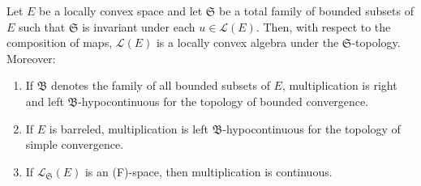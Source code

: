 Let $E$ be a locally convex space and let $\mathfrak{S}$ be a total family of bounded subsets of $E$ such that $\mathfrak{S}$ is invariant under each $u \in \mathcal{L}(E)$. Then, with respect to the composition of maps, $\mathcal{L}(E)$ is a locally convex algebra under the $\mathfrak{S}$-topology. Moreover:

\begin{enumerate}
\item If $\mathfrak{B}$ denotes the family of all bounded subsets of $E$, multiplication is right and left $\mathfrak{B}$-hypocontinuous for the topology of bounded convergence.
\item If $E$ is barreled, multiplication is left $\mathfrak{B}$-hypocontinuous for the topology of simple convergence.
\item If $\mathcal{L}_{\mathfrak{S}}(E)$ is an (F)-space, then multiplication is continuous.
\end{enumerate}
